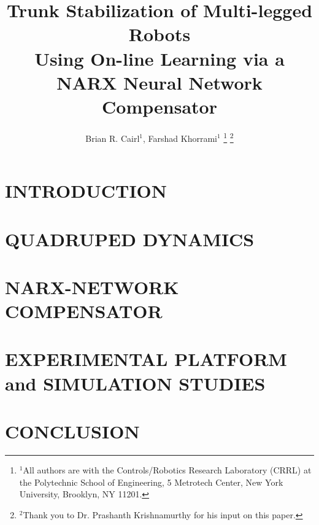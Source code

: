 \documentclass[letterpaper, 10 pt, conference]{ieeeconf}  %
\title{\LARGE \bf
Trunk Stabilization of Multi-legged Robots \\
Using On-line Learning via a NARX Neural Network Compensator
}
\author{
Brian R. Cairl$^{1}$,
Farshad Khorrami$^{1}$
\thanks{%
	$^{1}$All authors are with the Controls/Robotics Research Laboratory (CRRL)
	at the  Polytechnic School of Engineering,
	5 Metrotech Center, New York University, Brooklyn, NY 11201.
}%
\thanks{
	$^{2}$Thank you to Dr. Prashanth Krishnamurthy for his input on this paper.
}
}%
\begin{document}
\newcommand{\TightSectionBeg}[1]{\vspace{0mm}\section{#1}\vspace{-0.1mm}}
\newcommand{\TightSectionEnd}{\vspace{-0.1mm}}
\newcommand{\PostImageCloseSpace}{\vspace{-4mm}}

\maketitle
\thispagestyle{empty}
\pagestyle{empty}


\begin{abstract}



\end{abstract}


\section{INTRODUCTION}

%
%
\TightSectionBeg{QUADRUPED DYNAMICS}

\TightSectionEnd
%
%
\TightSectionBeg{NARX-NETWORK COMPENSATOR}

\TightSectionEnd
%
%
\TightSectionBeg{EXPERIMENTAL PLATFORM and SIMULATION STUDIES}

\TightSectionEnd
%
%
\TightSectionBeg{CONCLUSION}

\TightSectionEnd
%
%
%
%




\end{document}
